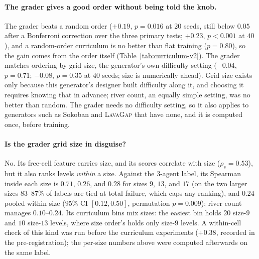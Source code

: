 \documentclass[twoside]{article}
\begin{document}
\paragraph{The grader gives a good order without being told the knob.} The grader beats a random order ($+0.19$, $p=0.016$ at $20$ seeds, still below $0.05$ after a Bonferroni correction over the three primary tests; $+0.23$, $p<0.001$ at $40$), and a random-order curriculum is no better than flat training ($p=0.80$), so the gain comes from the order itself (Table~\ref{tab:curriculum-v2}). The grader matches ordering by grid size, the generator's own difficulty setting ($-0.04$, $p=0.71$; $-0.08$, $p=0.35$ at $40$ seeds; size is numerically ahead). Grid size exists only because this generator's designer built difficulty along it, and choosing it requires knowing that in advance; river count, an equally simple setting, was no better than random. The grader needs no difficulty setting, so it also applies to generators such as Sokoban and \textsc{LavaGap} that have none, and it is computed once, before training.

\paragraph{Is the grader grid size in disguise?} No. Its free-cell feature carries size, and its scores correlate with size ($\rho_s=0.53$), but it also ranks levels \emph{within} a size. Against the $3$-agent label, its Spearman inside each size is $0.71$, $0.26$, and $0.28$ for sizes $9$, $13$, and $17$ (on the two larger sizes $83$--$87\%$ of labels are tied at total failure, which caps any ranking), and $0.24$ pooled within size ($95\%$ CI $[0.12, 0.50]$, permutation $p=0.009$); river count manages $0.10$--$0.24$. Its curriculum bins mix sizes: the easiest bin holds $20$ size-$9$ and $10$ size-$13$ levels, where size order's holds only size-$9$ levels. A within-cell check of this kind was run before the curriculum experiments ($+0.38$, recorded in the pre-registration); the per-size numbers above were computed afterwards on the same label.
\end{document}
